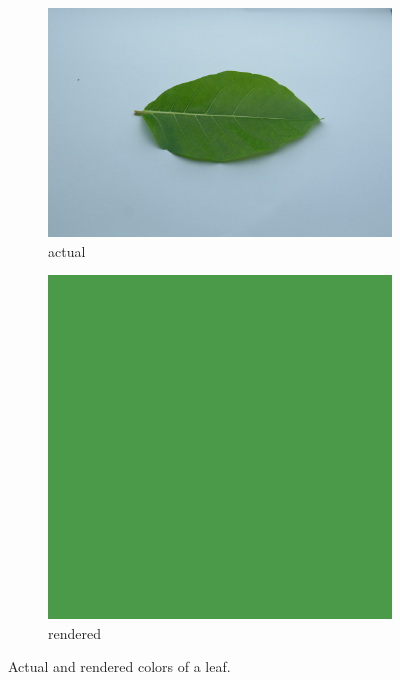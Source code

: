 \documentclass[12pt,a4paper]{article}
\begin{document}
\begin{figure}[htb]
	\centering
	\begin{subfigure}[h!]{0.49\textwidth}
		\includegraphics[width=\textwidth]{leaf1.png}
		\caption{actual}
		\label{fig:leaf-actual}
	\end{subfigure}
	\begin{subfigure}[h!]{0.33\textwidth}
		\includegraphics[width=\textwidth]{render.png}
		\caption{rendered}
		\label{fig:leaf-render}
	\end{subfigure}
	\caption{Actual and rendered colors of a leaf.}
	\label{fig:render}
\end{figure}





\end{document}
